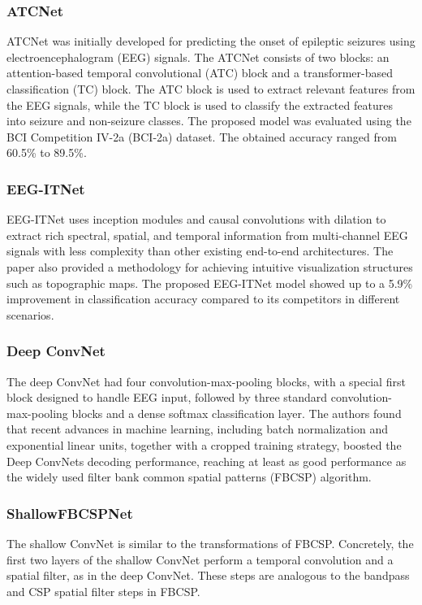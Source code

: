 \subsubsection{ATCNet}
ATCNet was initially developed for predicting the onset of epileptic seizures using electroencephalogram (EEG) signals.
The ATCNet consists of two blocks: an attention-based temporal convolutional (ATC) block and a transformer-based classification (TC) block.
The ATC block is used to extract relevant features from the EEG signals, while the TC block is used to classify the extracted features into seizure and non-seizure classes.
The proposed model was evaluated using the BCI Competition IV-2a (BCI-2a) dataset.
The obtained accuracy ranged from 60.5\% to 89.5\%.

\subsubsection{EEG-ITNet}
EEG-ITNet uses inception modules and causal convolutions with dilation to extract rich spectral, spatial, and temporal information from multi-channel EEG signals with less complexity than other existing end-to-end architectures. 
The paper also provided a methodology for achieving intuitive visualization structures such as topographic maps.
The proposed EEG-ITNet model showed up to a 5.9\% improvement in classification accuracy compared to its competitors in different scenarios.

\subsubsection{Deep ConvNet}
The deep ConvNet had four convolution-max-pooling blocks, with a special first block designed to handle EEG input, followed by three standard convolution-max-pooling blocks and a dense softmax classification layer.
The authors found that recent advances in machine learning, including batch normalization and exponential linear units, together with a cropped training strategy, boosted the Deep ConvNets decoding performance, reaching at least as good performance as the widely used filter bank common spatial patterns (FBCSP) algorithm.

\subsubsection{ShallowFBCSPNet}
The shallow ConvNet is similar to the transformations of FBCSP.
Concretely, the first two layers of the shallow ConvNet perform a temporal convolution and a spatial filter, as in the deep ConvNet.
These steps are analogous to the bandpass and CSP spatial filter steps in FBCSP.